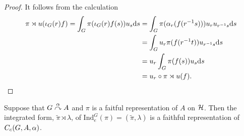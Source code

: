 \begin{proof}
It follows from the calculation
\begin{align*}
	\pi \rtimes u (\iota_G(r)f) = \int_G \pi(\iota_G(r) f(s) ) u_s \mathrm{d} s &= \int_G \pi(\alpha_r(f(r^{-1}s))) u_ru_{r^{-1}s} \mathrm{d} s\\
	&= \int_G u_r \pi(f(r^{-1}t)) u_{r^{-1}s} \mathrm{d} s \\
	&= u_r \int_G  \pi(f(s)) u_s \mathrm{d} s \\
	&= u_r \circ \pi \rtimes u (f).
\end{align*}
\end{proof}
\begin{lemma}
	Suppose that $G \stackrel{\alpha}{\curvearrowright} A$ and $\pi$ is a faitful representation of $A$ on $\mathcal{H}$. Then the integrated form, $\tilde{\pi} \rtimes \lambda$, of $\mathrm{Ind}_e^G (\pi)=(\tilde \pi , \lambda)$ is a faithful representation of $C_c(G,A,\alpha)$.
	\label{cross:regfaith}
\end{lemma}
